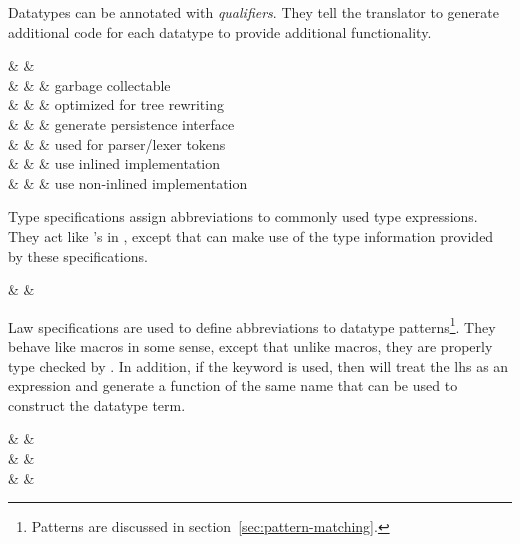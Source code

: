 Datatypes can be annotated with {\em qualifiers}.  They tell the \Prop{}
translator to generate additional code for each datatype to provide
additional functionality. 

\begin{syntax}
   & \IS &  \\
   & \IS &  & garbage collectable \\
   & \OR &      & optimized for tree rewriting \\
   & \OR &   & generate persistence interface \\
   & \OR &       & used for parser/lexer tokens  \\
   & \OR &       & use inlined implementation \\
   & \OR &       & use non-inlined implementation \\
\end{syntax}

Type specifications assign abbreviations to commonly used type expressions. 
They act like 's in \Cpp, except that \Prop{} can make use
of the type information provided by these specifications.

\begin{syntax}
   & \IS & \Id \T{=} \TypeExp \\
\end{syntax}

Law specifications are used to define abbreviations to datatype 
patterns\footnote{Patterns are discussed in 
section~\ref{sec:pattern-matching}.}.
They behave like macros in some sense, except that unlike macros, they are
properly type checked by \Prop.  In addition, if the keyword  is 
used, then \Prop{} will treat the lhs as an expression and generate 
a function of the same name that can be used to construct the datatype term.

\begin{syntax}
   & \IS &  \Id {} \T{=} \Pat \\
   & \IS & \Id \\
   & \OR & \T{(}  \T{)} \\
\end{syntax}

